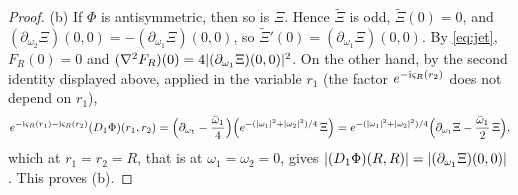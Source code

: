 \begin{proof}
(b) If $\Phi$ is antisymmetric, then so is $\Xi$. Hence $\widetilde\Xi$ is odd, $\widetilde\Xi(0)=0$, and
$(\partial_{\omega_2}\Xi)(0,0)=-(\partial_{\omega_1}\Xi)(0,0)$, so $\widetilde\Xi'(0)=(\partial_{\omega_1}\Xi)(0,0)$. By \eqref{eq:jet},
$F_R(0)=0$ and $(\nabla^2F_R)(0)=4\lvert(\partial_{\omega_1}\Xi)(0,0)\rvert^2$. On the other hand, by the second identity displayed
above, applied in the variable $r_1$ (the factor $e^{-\mathrm{i}\varsigma_R(r_2)}$ does not depend on $r_1$),
\[
e^{-\mathrm{i}\varsigma_R(r_1)-\mathrm{i}\varsigma_R(r_2)}(D_1\Phi)(r_1,r_2)=\Bigl(\partial_{\omega_1}-\frac{\bar\omega_1}4\Bigr)\Bigl(e^{-(\lvert\omega_1\rvert^2+\lvert\omega_2\rvert^2)/4}\,\Xi\Bigr)
=e^{-(\lvert\omega_1\rvert^2+\lvert\omega_2\rvert^2)/4}\Bigl(\partial_{\omega_1}\Xi-\frac{\bar\omega_1}2\,\Xi\Bigr),
\]
which at $r_1=r_2=R$, that is at $\omega_1=\omega_2=0$, gives $\lvert(D_1\Phi)(R,R)\rvert=\lvert(\partial_{\omega_1}\Xi)(0,0)\rvert$. This proves
(b).
\end{proof}

